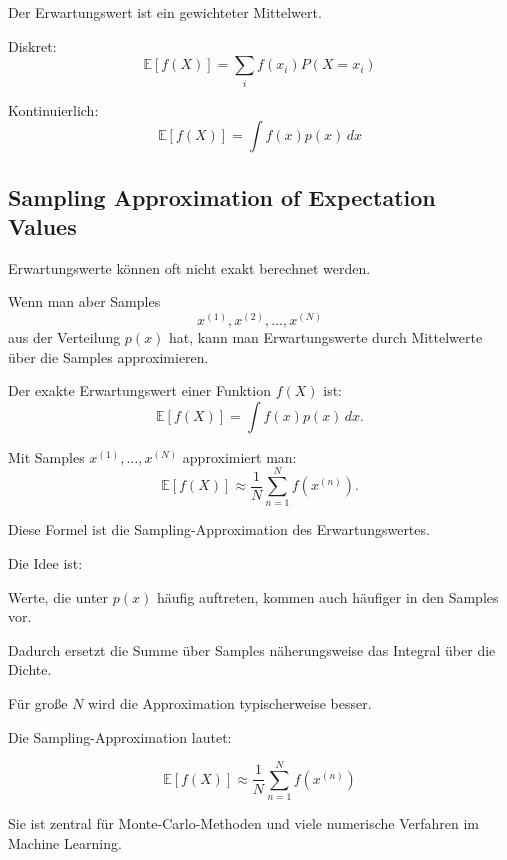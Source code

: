 \documentclass[11pt,a4paper]{scrartcl}
\begin{document}
\begin{answerbox}
    Der Erwartungswert ist ein gewichteter Mittelwert.

    Diskret:
    \[
        \boxed{
            \mathbb{E}[f(X)]
            =
            \sum_i f(x_i)P(X=x_i)
        }
    \]

    Kontinuierlich:
    \[
        \boxed{
            \mathbb{E}[f(X)]
            =
            \int f(x)p(x)\,dx
        }
    \]
\end{answerbox}

\subsection{Sampling Approximation of Expectation Values}

\begin{notebox}
    Erwartungswerte können oft nicht exakt berechnet werden.

    Wenn man aber Samples
    \[
        x^{(1)},x^{(2)},\dots,x^{(N)}
    \]
    aus der Verteilung \(p(x)\) hat, kann man Erwartungswerte durch Mittelwerte
    über die Samples approximieren.
\end{notebox}

\begin{calculationbox}
    Der exakte Erwartungswert einer Funktion \(f(X)\) ist:
    \[
        \mathbb{E}[f(X)]
        =
        \int f(x)p(x)\,dx.
    \]

    Mit Samples \(x^{(1)},\dots,x^{(N)}\) approximiert man:
    \[
        \mathbb{E}[f(X)]
        \approx
        \frac{1}{N}
        \sum_{n=1}^{N}
        f(x^{(n)}).
    \]

    Diese Formel ist die Sampling-Approximation des Erwartungswertes.
\end{calculationbox}

\begin{solutionbox}
    Die Idee ist:

    Werte, die unter \(p(x)\) häufig auftreten, kommen auch häufiger in den
    Samples vor.

    Dadurch ersetzt die Summe über Samples näherungsweise das Integral über die
    Dichte.

    Für große \(N\) wird die Approximation typischerweise besser.
\end{solutionbox}

\begin{answerbox}
    Die Sampling-Approximation lautet:

    \[
        \boxed{
            \mathbb{E}[f(X)]
            \approx
            \frac{1}{N}
            \sum_{n=1}^{N}
            f(x^{(n)})
        }
    \]

    Sie ist zentral für Monte-Carlo-Methoden und viele numerische Verfahren im
    Machine Learning.
\end{answerbox}
\end{document}
